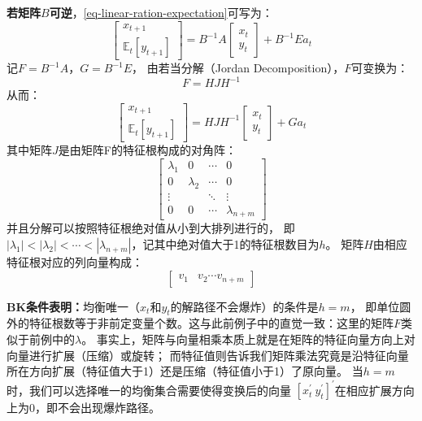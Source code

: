 \textbf{若矩阵$B$可逆}，\cref{eq-linear-ration-expectation}可写为：
\begin{equation}    \label{eq-linear-ration-expectation-invB}
    \begin{bmatrix}
        x_{t+1} \\
        \mathbb{E}_t \left[y_{t+1}\right]
    \end{bmatrix}
    =
    B^{-1}A
        \begin{bmatrix}
            x_t \\
            y_t
        \end{bmatrix}
    + B^{-1}E a_t
\end{equation}
记$F=B^{-1}A$，$G=B^{-1}E$，
由若当分解（Jordan Decomposition），$F$可变换为：
\begin{equation*}
    F = HJH^{-1}
\end{equation*}
从而：
\begin{equation}    \label{eq-linear-ration-expectation-jordan}
    \begin{bmatrix}
        x_{t+1} \\
        \mathbb{E}_t\left[y_{t+1}\right]
    \end{bmatrix}
    =
    HJH^{-1}
    \begin{bmatrix}
        x_t \\
        y_t
    \end{bmatrix}
    + G a_t
\end{equation}
其中矩阵$J$是由矩阵F的特征根构成的对角阵：
\[
    \begin{bmatrix}
        \lambda_1 & 0 & \cdots & 0 \\
        0 & \lambda_2 & \cdots & 0 \\
        \vdots & ~ & \ddots & \vdots \\
        0 & 0 & \cdots & \lambda_{n+m}
    \end{bmatrix}
\]
并且分解可以按照特征根绝对值从小到大排列进行的，
即$\left|\lambda_1\right|<\left|\lambda_2\right|<\cdots<\left|\lambda_{n+m}\right|$，记其中绝对值大于1的特征根数目为$h$。
矩阵$H$由相应特征根对应的列向量构成：
\[
    \begin{bmatrix}
        v_1 & v_2 \cdots v_{n+m}
    \end{bmatrix}
\]

\textbf{BK条件表明：}均衡唯一（$x_t$和$y_t$的解路径不会爆炸）的条件是$h=m$，
即单位圆外的特征根数等于非前定变量个数。这与此前例子中的直觉一致：这里的矩阵$F$类似于前例中的$\lambda$。
事实上，矩阵与向量相乘本质上就是在矩阵的特征向量方向上对向量进行扩展（压缩）或旋转；
而特征值则告诉我们矩阵乘法究竟是沿特征向量所在方向扩展（特征值大于1）还是压缩（特征值小于1）了原向量。
当$h=m$时，我们可以选择唯一的均衡集合需要使得变换后的向量
$\left[x_t^{\prime} ~ y_t^{\prime}\right]^{\prime}$在相应扩展方向上为0，即不会出现爆炸路径。

